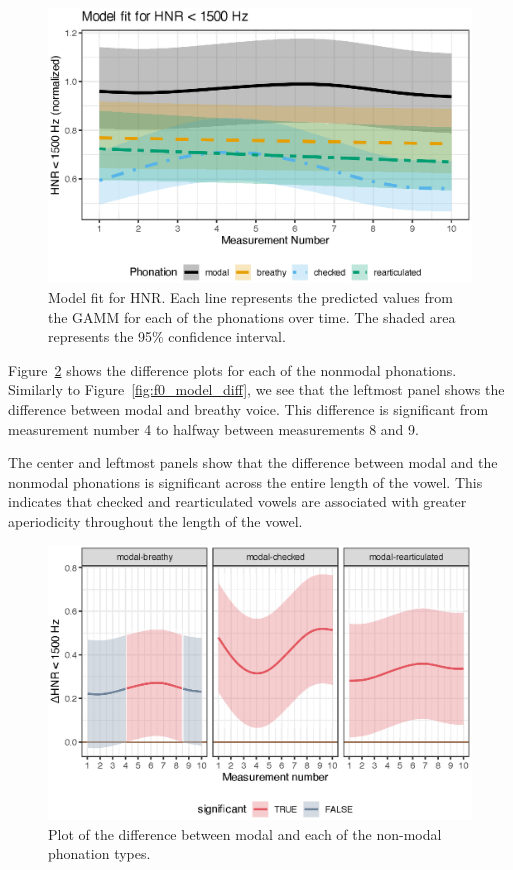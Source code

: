 \begin{figure}[h!]
    \centering
    \includegraphics[width = \linewidth]{images/LCH_GAMMs/hnr15_model_fit.eps}
    \caption{Model fit for HNR. Each line represents the predicted values from the GAMM for each of the phonations over time. The shaded area represents the 95\% confidence interval.}
    \label{fig:hnr_model_fit}
\end{figure}  

Figure~\ref{fig:hnr_model_diff} shows the difference plots for each of the nonmodal phonations. Similarly to Figure~\ref{fig:f0_model_diff}, we see that the leftmost panel shows the difference between modal and breathy voice. This difference is significant from measurement number 4 to halfway between measurements 8 and 9. 

The center and leftmost panels show that the difference between modal and the nonmodal phonations is significant across the entire length of the vowel. This indicates that checked and rearticulated vowels are associated with greater aperiodicity throughout the length of the vowel.

\begin{figure}[h!]
    \centering
    \includegraphics[width = \linewidth]{images/LCH_GAMMs/hnr15_model_diff.eps}
    \caption{Plot of the difference between modal and each of the non-modal phonation types.}
    \label{fig:hnr_model_diff}
\end{figure}

